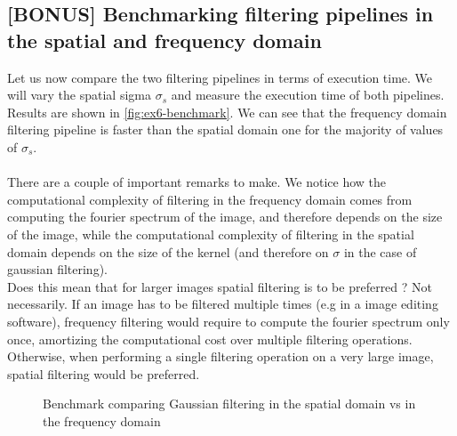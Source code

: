 \documentclass[tikz,14pt,fleqn]{article}
\begin{document}
\subsection{[BONUS] Benchmarking filtering pipelines in the spatial and frequency domain}
Let us now compare the two filtering pipelines in terms of execution time. We will vary the spatial sigma $\sigma_s$ and measure the execution time of both pipelines. Results are shown in \autoref{fig:ex6-benchmark}. We can see that the frequency domain filtering pipeline is faster than the spatial domain one for the majority of values of $\sigma_s$.\\\\
There are a couple of important remarks to make. We notice how the computational complexity of filtering in the frequency domain comes from computing the fourier spectrum of the image, and therefore depends on the size of the image, while the computational complexity of filtering in the spatial domain depends on the size of the kernel (and therefore on $\sigma$ in the case of gaussian filtering).\\Does this mean that for larger images spatial filtering is to be preferred ? Not necessarily. If an image has to be filtered multiple times (e.g in a image editing software), frequency filtering would require to compute the fourier spectrum only once, amortizing the computational cost over multiple filtering operations. Otherwise, when performing a single filtering operation on a very large image, spatial filtering would be preferred.
\begin{figure}[h!]
    \centering
{}
\caption{Benchmark comparing Gaussian filtering in the spatial domain vs in the frequency domain}
\label{fig:ex6-benchmark}
\end{figure}



\clearpage
\end{document}
